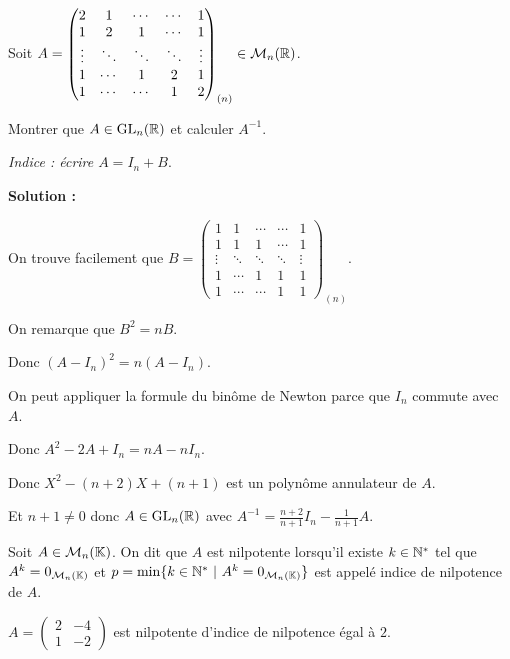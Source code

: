 \documentclass[12pt, a4paper]{report}
\begin{document}
\begin{exercise}
    Soit $A = \left(\begin{matrix} 2 & 1 & \cdots & \cdots & 1 \\ 1 & 2 & 1 & \cdots & 1 \\ \vdots & \ddots & \ddots & \ddots & \vdots \\ 1 & \cdots & 1 & 2 & 1 \\ 1 & \cdots & \cdots & 1 & 2 \end{matrix}\right)_{(n)} \in \mathcal M_n(\mathbb{R})$.

    Montrer que $A \in \mathrm{GL}_n(\mathbb{R})$ et calculer $A^{-1}$.

    \textit{Indice : écrire $A = I_n + B$}.

    \textbf{Solution :}

    On trouve facilement que $B = \left(\begin{matrix} 1 & 1 & \cdots & \cdots & 1 \\ 1 & 1 & 1 & \cdots & 1 \\ \vdots & \ddots & \ddots & \ddots & \vdots \\ 1 & \cdots & 1 & 1 & 1 \\ 1 & \cdots & \cdots & 1 & 1 \end{matrix}\right)_{(n)}$.

    On remarque que $B^2 = nB$.

    Donc $(A-I_n)^2 = n(A-I_n)$.

    On peut appliquer la formule du binôme de Newton parce que $I_n$ commute avec $A$.

    Donc $A^2 - 2A + I_n = nA - nI_n$.

    Donc $X^2 - (n+2)X + (n+1)$ est un polynôme annulateur de $A$.

    Et $n+1 \ne 0$ donc $A \in \mathrm{GL}_n(\mathbb{R})$ avec $A^{-1} = \frac{n+2}{n+1} I_n - \frac1{n+1}A$.
\end{exercise}

\begin{definition}
    Soit $A \in \mathcal M_n(\mathbb{K})$. On dit que $A$ est nilpotente lorsqu'il existe $k \in \mathbb{N}^*$ tel que $A^k = 0_{\mathcal M_n(\mathbb{K})}$ et $p = \min\{k \in \mathbb{N}^*~|~A^k = 0_{\mathcal M_n(\mathbb{K})}\}$ est appelé indice de nilpotence de $A$.
\end{definition}

\begin{example}
    $A = \left(\begin{matrix} 2 & -4 \\ 1 & -2 \end{matrix}\right)$ est nilpotente d'indice de nilpotence égal à $2$.
\end{example}
\end{document}
